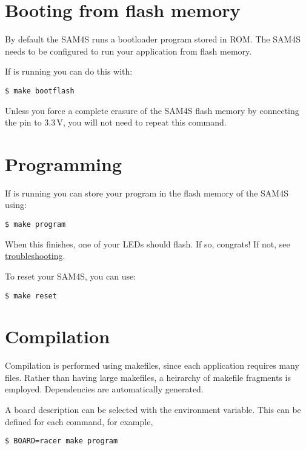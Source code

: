 \section{Booting from flash memory}
\label{booting-from-flash-memory}

By default the SAM4S runs a bootloader program stored in ROM. The SAM4S
needs to be configured to run your application from flash memory.

If  is running you can do this with:

\begin{verbatim}
$ make bootflash
\end{verbatim}

Unless you force a complete erasure of the SAM4S flash memory by
connecting the  pin to 3.3\,V, you will not need to repeat
this command.

\section{Programming}
\label{programming}

If  is running you can store your program in the flash
memory of the SAM4S using:

\begin{verbatim}
$ make program
\end{verbatim}

When this finishes, one of your LEDs should flash. If so, congrats! If
not, see \protect\hyperref[troubleshooting]{troubleshooting}.

To reset your SAM4S, you can use:
%
\begin{verbatim}
$ make reset
\end{verbatim}


\section{Compilation}

Compilation is performed using makefiles, since each application
requires many files.  Rather than having large makefiles, a heirarchy
of makefile fragments is employed.  Dependencies are automatically
generated.

A board description can be selected with the  environment
variable.  This can be defined for each command, for example,
%
\begin{verbatim}
$ BOARD=racer make program  
\end{verbatim}



